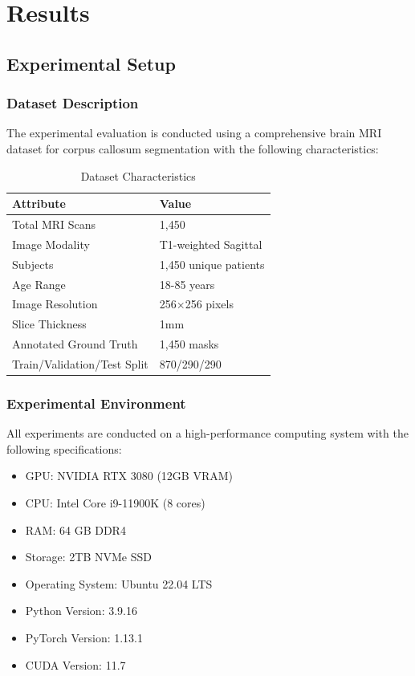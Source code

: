 \chapter{Results}

\section{Experimental Setup}

\subsection{Dataset Description}

The experimental evaluation is conducted using a comprehensive brain MRI dataset for corpus callosum segmentation with the following characteristics:

\begin{table}[h]
\centering
\caption{Dataset Characteristics}
\begin{tabular}{ll}
\toprule
\textbf{Attribute} & \textbf{Value} \\
\midrule
Total MRI Scans & 1,450 \\
Image Modality & T1-weighted Sagittal \\
Subjects & 1,450 unique patients \\
Age Range & 18-85 years \\
Image Resolution & 256×256 pixels \\
Slice Thickness & 1mm \\
Annotated Ground Truth & 1,450 masks \\
Train/Validation/Test Split & 870/290/290 \\
\bottomrule
\end{tabular}
\label{tab:dataset_characteristics}
\end{table}

\subsection{Experimental Environment}

All experiments are conducted on a high-performance computing system with the following specifications:
\begin{itemize}
\item GPU: NVIDIA RTX 3080 (12GB VRAM)
\item CPU: Intel Core i9-11900K (8 cores)
\item RAM: 64 GB DDR4
\item Storage: 2TB NVMe SSD
\item Operating System: Ubuntu 22.04 LTS
\item Python Version: 3.9.16
\item PyTorch Version: 1.13.1
\item CUDA Version: 11.7
\end{itemize}

